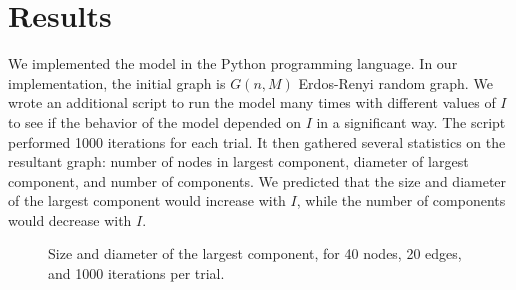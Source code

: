 \documentclass[a4paper,10pt]{article}
\begin{document}
\section{Results}

We implemented the model in the Python programming language. In our implementation, the initial graph is $G(n, M)$ Erdos-Renyi random graph. We wrote an additional script to run the model many times with different values of $I$ to see if the behavior of the model depended on $I$ in a significant way. The script performed 1000 iterations for each trial. It then gathered several statistics on the resultant graph: number of nodes in largest component, diameter of largest component, and number of components. We predicted that the size and diameter of the largest component would increase with $I$, while the number of components would decrease with $I$. 

\begin{figure}[H]
\begin{center}
\caption{Size and diameter of the largest component, for 40 nodes, 20 edges, and 1000 iterations per trial.}
\end{center}
\end{figure} 
\end{document}
